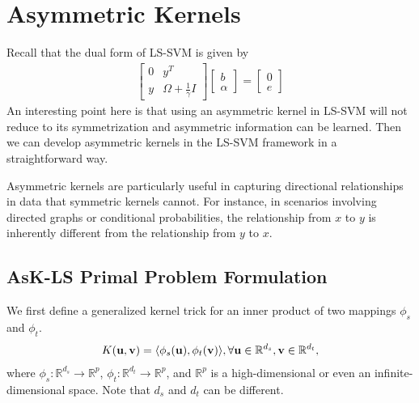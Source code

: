 \section{Asymmetric Kernels}
\label{sec:asymmetric_kernels}

Recall that the dual form of LS-SVM is given by
\begin{align*}
	\begin{bmatrix}
	0 & y^T \\
	y & \Omega + \frac{1}{\gamma} I
	\end{bmatrix}
	\begin{bmatrix}
	b \\
	\alpha
	\end{bmatrix}
	=
	\begin{bmatrix}
	0 \\
	e
	\end{bmatrix}
\end{align*}
An interesting point here is that using an asymmetric kernel in LS-SVM will not reduce to its symmetrization and asymmetric information can be learned. Then we can develop asymmetric kernels in the LS-SVM framework in a straightforward way.

Asymmetric kernels are particularly useful in capturing directional relationships in data that symmetric kernels cannot. For instance, in scenarios involving directed graphs or conditional probabilities, the relationship from $x$ to $y$ is inherently different from the relationship from $y$ to $x$.

\subsection{AsK-LS Primal Problem Formulation}
We first define a generalized kernel trick for an inner product of two mappings $\phi_s$ and $\phi_t$.
\begin{align*}
	K({\mathbf{u}}, {\mathbf{v}}) = \langle \phi_s({\mathbf{u}}), \phi_t({\mathbf{v}})\rangle, \forall {\mathbf{u}} \in \mathbb{R}^{d_s}, {\mathbf{v}} \in \mathbb{R}^{d_t},
\end{align*}
where $\phi_s: \mathbb{R}^{d_s}\to \mathbb{R}^{p}$, $\phi_t: \mathbb{R}^{d_t}\to \mathbb{R}^{p}$, and $\mathbb{R}^p$ is a high-dimensional or even an infinite-dimensional space. Note that $d_s$ and $d_t$ can be different. 

